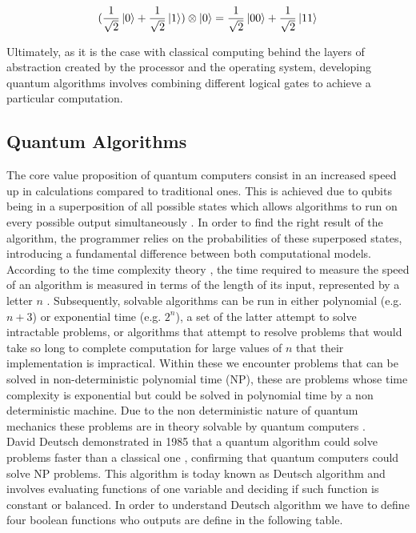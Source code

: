 \documentclass[12pt,a4paper]{scrartcl}
\newcommand{\tens}[1]{%
  \mathbin{\mathop{\otimes}\displaylimits_{#1}}%
}
\begin{document}
\begin{equation}
    (\frac{1}{\sqrt{2}}\ket{0} + \frac{1}{\sqrt{2}}\ket{1}) \tens{} \ket{0} =
    \frac{1}{\sqrt{2}}\ket{00} + \frac{1}{\sqrt{2}}\ket{11}
\end{equation}

Ultimately, as it is the case with classical computing behind the layers of abstraction created by the processor and the operating system, developing quantum algorithms involves combining different logical gates to achieve a particular computation. 

\subsection{Quantum Algorithms}

The core value proposition of quantum computers consist in an increased speed up in calculations compared to traditional ones. This is achieved due to qubits being in a superposition of all possible states which allows algorithms to run on every possible output simultaneously \cite{bernhardt2019quantum}. In order to find the right result of the algorithm, the programmer relies on the probabilities of these superposed states, introducing a fundamental difference between both computational models.\\

According to the time complexity theory \cite{goodrich2001algorithm}, the time required to measure the speed of an algorithm is measured in terms of the length of its input, represented by a letter $n$ \cite{goodrich2001algorithm}. Subsequently, solvable algorithms can be run in either polynomial (e.g. $n+3$) or exponential time (e.g. $2^n$), a set of the latter attempt to solve intractable problems, or algorithms that attempt to resolve problems that would take so long to complete computation for large values of $n$ that their implementation is impractical. Within these we encounter problems that can be solved in non-deterministic polynomial time (NP), these are problems whose time complexity is exponential but could be solved in polynomial time by a non deterministic machine. Due to the non deterministic nature of quantum mechanics these problems are in theory solvable by quantum computers \cite{bernhardt2019quantum}.\\

David Deutsch demonstrated in 1985 that a quantum algorithm could solve problems faster than a classical one \cite{DeutschPenrose1985}, confirming that quantum computers could solve NP problems. This algorithm is today known as Deutsch algorithm and involves evaluating functions of one variable and deciding if such function is constant or balanced.
In order to understand Deutsch algorithm we have to define four boolean functions who outputs are define in the following table.
\end{document}
